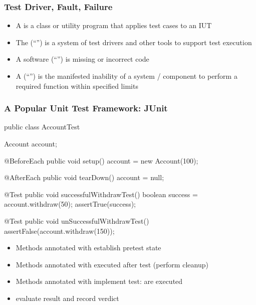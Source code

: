 \subsubsection*{Test Driver, Fault, Failure}
\begin{defBox}[title=Definition(Test Driver\, Test Harness)]
    \begin{itemize}
        \item A  is a class or utility program that applies test cases to an IUT
        \item The  (\enquote{}) is a system of test drivers and other tools to support test execution
    \end{itemize}
\end{defBox}
\begin{defBox}[title=Definition (Fault\, Failure)]
    \begin{itemize}
        \item A software  (\enquote{}) is missing or incorrect code
        \item A  (\enquote{}) is the manifested inability of a system / component to perform a required function within specified limits
    \end{itemize}
\end{defBox}
\subsubsection*{A Popular Unit Test Framework: JUnit}
\begin{codeBlock}{}
    public class AccountTest{
        Account account;

        @BeforeEach
        public void setup(){
            account = new Account(100);
        }

        @AfterEach
        public void tearDown(){ account = null; }

        @Test
        public void successfulWithdrawTest(){
            boolean success = account.withdraw(50);
            assertTrue(success);
        }

        @Test
        public void unSuccessfulWithdrawTest(){
            assertFalse(account.withdraw(150));
        }
    }
\end{codeBlock}
\begin{defBox}[title=Test Framework: JUnit]
    \begin{itemize}
        \item Methods annotated with  establish pretest state
        \item Methods annotated with  executed after test (perform cleanup)
        \item Methods annotated with  implement test: are executed
        \item {} evaluate result and record verdict
    \end{itemize}
\end{defBox}
